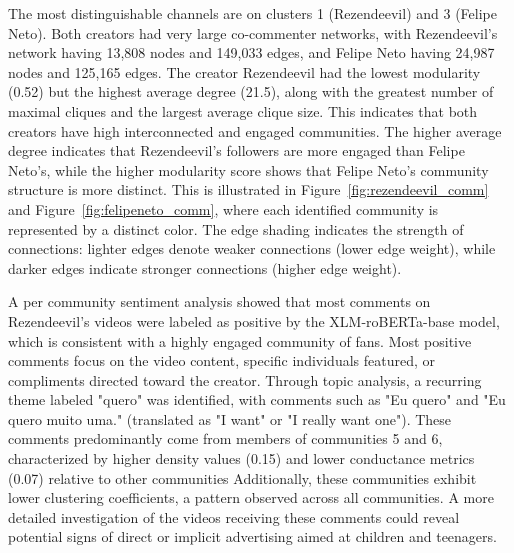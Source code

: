 \documentclass[12pt]{article}
\begin{document}
The most distinguishable channels are on clusters 1 (Rezendeevil) and 3 (Felipe Neto). 
Both creators had very large co-commenter networks, with Rezendeevil's network having 13,808 
nodes and 149,033 edges, and Felipe Neto having 24,987 nodes and 125,165 edges.
The creator Rezendeevil had the lowest modularity (0.52) but the highest average degree (21.5), 
along with the greatest number of maximal cliques and the largest average clique size.
This indicates that both creators have high interconnected and engaged communities. The higher average
degree indicates that Rezendeevil's followers are more engaged than Felipe Neto's, while the higher
modularity score shows that Felipe Neto's community structure is more distinct.
This is illustrated in Figure~\ref{fig:rezendeevil_comm} and Figure~\ref{fig:felipeneto_comm}, 
where each identified community is represented by a distinct color. The edge shading indicates 
the strength of connections: lighter edges denote weaker connections (lower edge weight), 
while darker edges indicate stronger connections (higher edge weight).

A per community sentiment analysis showed that most comments on Rezendeevil's videos were labeled as 
positive by the XLM-roBERTa-base model, which is consistent with a highly engaged community of fans.
Most positive comments focus on the video content, specific individuals featured, or compliments directed toward the creator. 
Through topic analysis, a recurring theme labeled 
"quero" was identified, with comments such as "Eu quero" and "Eu quero muito uma." 
(translated as "I want" or "I really want one").
These comments predominantly come from members of communities 5 and 6, characterized by higher density 
values (0.15) and lower conductance metrics (0.07) relative to other communities
Additionally, these communities exhibit lower clustering coefficients, a pattern observed across all communities.
A more detailed investigation of the videos receiving these comments could reveal potential 
signs of direct or implicit advertising aimed at children and teenagers.
\end{document}
